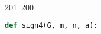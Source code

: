 201~200~\documentclass{article}
\begin{document}
	                                                                        	                                                                    	                                	                    	                    	                        	                        	                    	                                                                	                	                                                                    	                    							                                                                                                                                                                                                    		                                                                                                                        				    			                                                                    \begin{lstlisting}[language=Python, caption=Signature Chall 4]
	                                                                        	                                                                    	                                	                    	                    	                        	                        	                    	                                                                	                	                                                                    	                    							                                                                                                                                                                                                    		                                                                                                                        				    			                                                                    def sign4(G, m, n, a):
	                                                                        	                                                                    	                                	                    	                    	                        	                        	                    	                                                                	                	                                                                    	                    							                                                                                                                                                                                                    		                                                                                                                        				    			                                                                        F = Integers(n)

\end{lstlisting}
\end{document}
